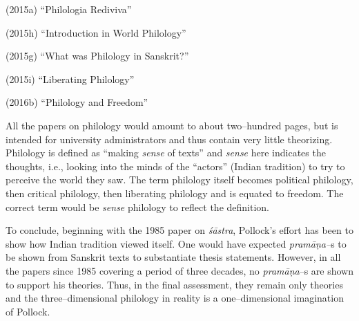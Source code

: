 (2015a) “Philologia Rediviva”

(2015h) “Introduction in World Philology”

(2015g) “What was Philology in Sanskrit?”

(2015i) “Liberating Philology”

(2016b) “Philology and Freedom”

All the papers on philology would amount to about two–hundred pages, but is intended for university administrators and thus contain very little theorizing. Philology is defined as “making \textit{sense} of texts” and \textit{sense} here indicates the thoughts, i.e., looking into the minds of the “actors” (Indian tradition) to try to perceive the world they saw. The term philology itself becomes political philology, then critical philology, then liberating philology and is equated to freedom. The correct term would be \textit{sense} philology to reflect the definition.

To conclude, beginning with the 1985 paper on \textit{śāstra}, Pollock’s effort has been to show how Indian tradition viewed itself. One would have expected \textit{pramāṇa–}s to be shown from Sanskrit texts to substantiate thesis statements. However, in all the papers since 1985 covering a period of three decades, no \textit{pramāṇa}–s are shown to support his theories. Thus, in the final assessment, they remain only theories and the three–dimensional philology in reality is a one–dimensional imagination of Pollock.

